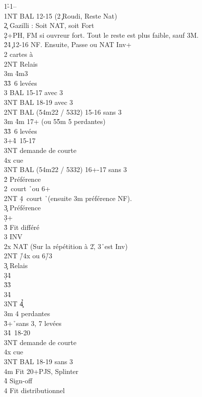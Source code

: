 \documentclass[a4paper]{article}
\begin{document}
\begin{bidtable}
1\h-1\s--\\
1NT \> BAL 12-15 (2\c\ Roudi, Reste Nat)\\
2\c \> Gazilli : Soit NAT, soit Fort\+\\
2\d {}+PH, FM si ouvreur fort. Tout le reste est plus faible, sauf 3M.\+\\
2\h {}\h 4\c\ 12-16 NF. Ensuite, Passe ou NAT Inv+\\
2\s {} cartes à \s \+\\
2NT \> Relais\+\\
3m \h 4m3\s \\
3\h {}\h 3\s\ 6 levées\\
3\s \> BAL 15-17 avec 3\s \\
3NT \> BAL 18-19 avec 3\s \-\-\\
2NT \> BAL (54m22 / 5332) 15-16 sans 3\s \\
3m \h 4m 17+ (ou 5\h 5m 5 perdantes)\\
3\h {}\h 3\s\ 6 levées\\
3\s {}+\h 4\s\ 15-17\+\\
3NT \> demande de courte\\
4x \> cue\-\\
3NT \> BAL (54m22 / 5332) 16+-17 sans 3\s \-\\
2\h \> Préférence\\
2\s {}\s\ court \h\ ou 6+\s \\
2NT \d 4\s\ court \h\ (ensuite 3m préférence NF).\\
3\c \> Préférence\\
3\d {}+\d \\
3\h \> Fit différé\\
3\s \> INV\-\\
2x \> NAT (Sur la répétition à 2\h , 3\h\ est Inv)\\
2NT \h /4x ou 6\h /3\s \+\\
3\c \> Relais\+\\
3\d {}\h 4\d \\
3\h {}\h 3\s \\
3\s {}\h 4\s \\
3NT \h 4\c \-\-\\
3m  4 perdantes\\
3\h {}+\h\ sans 3\s , 7 levées\\
3\s {}\h 4\s\ 18-20\+\\
3NT \> demande de courte\\
4x \> cue\-\\
3NT \> BAL 18-19 sans 3\s \\
4m \> Fit 20+PJS, Splinter\\
4\h \> Sign-off\\
4\s \> Fit distributionnel
\end{bidtable}
\end{document}

